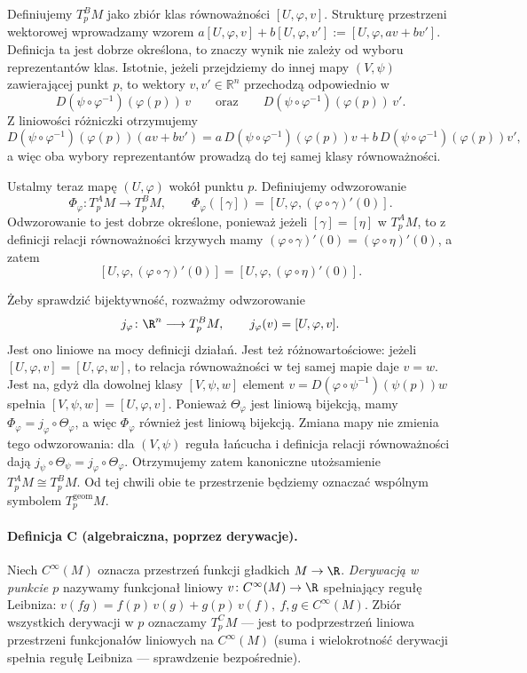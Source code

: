 Definiujemy $T_p^BM$ jako zbiór klas równoważności $[U,\varphi,v]$.
Strukturę przestrzeni wektorowej wprowadzamy wzorem $a[U,\varphi,v]+b[U,\varphi,v'] := [U,\varphi,av+bv']$.
Definicja ta jest dobrze określona, to znaczy wynik nie zależy od wyboru
reprezentantów klas. Istotnie, jeżeli przejdziemy do innej mapy
$(V,\psi)$ zawierającej punkt $p$, to wektory $v,v'\in\mathbb{R}^n$
przechodzą odpowiednio w
\[
D(\psi\circ\varphi^{-1})(\varphi(p))\,v
\qquad\text{oraz}\qquad
D(\psi\circ\varphi^{-1})(\varphi(p))\,v'.
\]
Z liniowości różniczki otrzymujemy
\[
D(\psi\circ\varphi^{-1})(\varphi(p))(av+bv')
=
a\,D(\psi\circ\varphi^{-1})(\varphi(p))v
+
b\,D(\psi\circ\varphi^{-1})(\varphi(p))v',
\]
a więc oba wybory reprezentantów prowadzą do tej samej klasy
równoważności.

Ustalmy teraz mapę $(U,\varphi)$ wokół punktu $p$. Definiujemy
odwzorowanie
\[
\Phi_\varphi\colon T_p^AM\longrightarrow T_p^BM,
\qquad
\Phi_\varphi([\gamma])
=
[U,\varphi,(\varphi\circ\gamma)'(0)].
\]
Odwzorowanie to jest dobrze określone, ponieważ jeżeli
$[\gamma]=[\eta]$ w $T_p^AM$, to z definicji relacji równoważności
krzywych mamy $(\varphi\circ\gamma)'(0) = (\varphi\circ\eta)'(0)$,
a zatem
\[
[U,\varphi,(\varphi\circ\gamma)'(0)]
=
[U,\varphi,(\varphi\circ\eta)'(0)].
\]

Żeby sprawdzić bijektywność, rozważmy odwzorowanie
\[
j_\varphi\colon\R^n\longrightarrow T_p^BM,
\qquad j_\varphi(v)=[U,\varphi,v].
\]
Jest ono liniowe na mocy definicji działań. Jest też
różnowartościowe: jeżeli $[U,\varphi,v]=[U,\varphi,w]$,
to relacja równoważności w tej samej mapie daje $v=w$.
Jest na, gdyż dla dowolnej klasy $[V,\psi,w]$ element $v=D(\varphi\circ\psi^{-1})(\psi(p))w$
spełnia $[V,\psi,w]=[U,\varphi,v]$. Ponieważ
$\Theta_\varphi$ jest liniową bijekcją, mamy
$\Phi_\varphi=j_\varphi\circ\Theta_\varphi$,
a więc $\Phi_\varphi$ również jest liniową bijekcją.
Zmiana mapy nie zmienia tego odwzorowania: dla $(V,\psi)$
reguła łańcucha i definicja relacji równoważności dają
$j_\psi\circ\Theta_\psi=j_\varphi\circ\Theta_\varphi$.
Otrzymujemy zatem kanoniczne utożsamienie $T_p^AM\cong T_p^BM$.
Od tej chwili obie te przestrzenie będziemy oznaczać wspólnym symbolem $T_p^{\mathrm{geom}}M$.

\paragraph*{Definicja C (algebraiczna, poprzez derywacje).} Niech $C^\infty(M)$ oznacza
przestrzeń funkcji gładkich $M\to\R$. \emph{Derywacją w punkcie $p$} nazywamy funkcjonał
liniowy $v\colon C^\infty(M)\to\R$ spełniający regułę Leibniza: $v(fg)=f(p)\,v(g)+g(p)\,v(f), \ f,g\in C^\infty(M)$.
Zbiór wszystkich derywacji w $p$ oznaczamy $T_p^CM$ — jest to podprzestrzeń liniowa
przestrzeni funkcjonałów liniowych na $C^\infty(M)$ (suma i wielokrotność derywacji
spełnia regułę Leibniza — sprawdzenie bezpośrednie).

